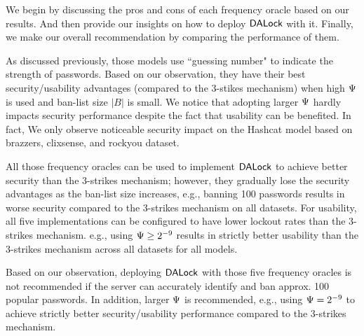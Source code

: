 
We begin by discussing the pros and cons of each frequency oracle based on our results. And then provide our insights on how to deploy $\mathsf{DALock}$ with it. Finally, we make our overall recommendation by comparing the performance of them.


 As discussed previously, those models use ``guessing number" to indicate the strength of passwords. Based on our observation, they have their best security/usability advantages (compared to the 3-stikes mechanism) when high $\Psi$ is used and ban-list size $|B|$ is small. We notice that adopting larger $\Psi$ hardly impacts security performance despite the fact that usability can be benefited. In fact, We only observe noticeable security impact on the Hashcat model based on brazzers, clixsense, and rockyou dataset. 

All those frequency oracles can be used to implement $\mathsf{DALock}$ to achieve better security than the 3-strikes mechanism; however, they gradually lose the security advantages as the ban-list size increases, e.g., banning 100 passwords results in worse security compared to the 3-strikes mechanism on all datasets. For usability, all five implementations can be configured to have lower lockout rates than the 3-strikes mechanism. e.g., using $\Psi \ge 2^{-9}$ results in strictly better usability than the 3-strikes mechanism across all datasets for all models. 

Based on our observation, deploying $\mathsf{DALock}$ with those five frequency oracles is not recommended if the server can accurately identify and ban approx. 100 popular passwords. In addition, larger $\Psi$ is recommended, e.g., using $\Psi = 2^{-9}$ to achieve strictly better security/usability performance compared to the 3-strikes mechanism.



